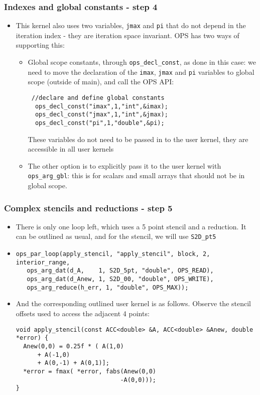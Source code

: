 \documentclass{beamer}
\begin{document}
\begin{frame}[fragile]
\frametitle{Indexes and global constants - step 4}
\begin{itemize}
\item This kernel also uses two variables, \texttt{jmax} and \texttt{pi} that do not depend in the iteration index - they are iteration space invariant. OPS has two ways of supporting this:
\begin{itemize}
\item Global scope constants, through \texttt{ops\_decl\_const}, as done in this case: we need to move the declaration of the \texttt{imax}, \texttt{jmax} and \texttt{pi} variables to global scope (outside of main), and call the OPS API:
\begin{lstlisting}
 //declare and define global constants
  ops_decl_const("imax",1,"int",&imax);
  ops_decl_const("jmax",1,"int",&jmax);
  ops_decl_const("pi",1,"double",&pi);
\end{lstlisting}  
These variables do not need to be passed in to the user kernel, they are accessible in all user kernels
\item The other option is to explicitly pass it to the user kernel with \texttt{ops\_arg\_gbl}: this is for scalars and small arrays that should not be in global scope.
\end{itemize}
\end{itemize}
\end{frame}

\begin{frame}[fragile]
\frametitle{Complex stencils and reductions - step 5}
\begin{itemize}
\item There is only one loop left, which uses a 5 point stencil and a reduction. It can be outlined as usual, and for the stencil, we will use \texttt{S2D\_pt5}
\item \begin{lstlisting}
ops_par_loop(apply_stencil, "apply_stencil", block, 2, interior_range,
   ops_arg_dat(d_A,    1, S2D_5pt, "double", OPS_READ),
   ops_arg_dat(d_Anew, 1, S2D_00, "double", OPS_WRITE),
   ops_arg_reduce(h_err, 1, "double", OPS_MAX));
\end{lstlisting}  
  \item And the corresponding outlined user kernel is as follows. Observe the stencil offsets used to access the adjacent 4 points:
\begin{lstlisting}
void apply_stencil(const ACC<double> &A, ACC<double> &Anew, double *error) {
  Anew(0,0) = 0.25f * ( A(1,0) 
      + A(-1,0)
      + A(0,-1) + A(0,1)];
  *error = fmax( *error, fabs(Anew(0,0)
                             -A(0,0)));
}
\end{lstlisting}  
\end{itemize}
\end{frame}
\end{document}
